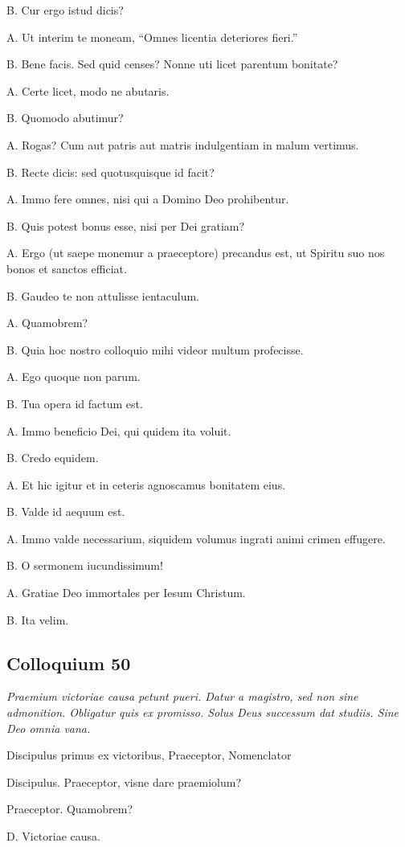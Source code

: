 \documentclass{article}
\begin{document}
B. Cur ergo istud dicis?

A. Ut interim te moneam, ``Omnes licentia deteriores fieri.''

B. Bene facis. Sed quid censes? Nonne uti licet parentum bonitate?

A. Certe licet, modo ne abutaris.

B. Quomodo abutimur?

A. Rogas? Cum aut patris aut matris indulgentiam in malum vertimus.

B. Recte dicis: sed quotusquisque id facit?

A. Immo fere omnes, nisi qui a Domino Deo prohibentur.

B. Quis potest bonus esse, nisi per Dei gratiam?

A. Ergo (ut saepe monemur a praeceptore) precandus est, ut Spiritu suo nos bonos et sanctos efficiat.

B. Gaudeo te non attulisse ientaculum.

A. Quamobrem?

B. Quia hoc nostro colloquio mihi videor multum profecisse.

A. Ego quoque non parum.

B. Tua opera id factum est.

 
A. Immo beneficio Dei, qui quidem ita voluit.

B. Credo equidem.

A. Et hic igitur et in ceteris agnoscamus bonitatem eius.

B. Valde id aequum est.

A. Immo valde necessarium, siquidem volumus ingrati animi crimen effugere.

B. O sermonem iucundissimum!

A. Gratiae Deo immortales per Iesum Christum.

B. Ita velim.

\subsection{Colloquium 50}
\emph{Praemium victoriae causa petunt pueri. Datur a magistro, sed non sine admonition. Obligatur quis ex promisso. Solus Deus successum dat studiis. Sine Deo omnia vana.}

Discipulus primus ex victoribus, Praeceptor, Nomenclator

Discipulus. Praeceptor, visne dare praemiolum?

Praeceptor. Quamobrem?

D. Victoriae causa.
\end{document}
